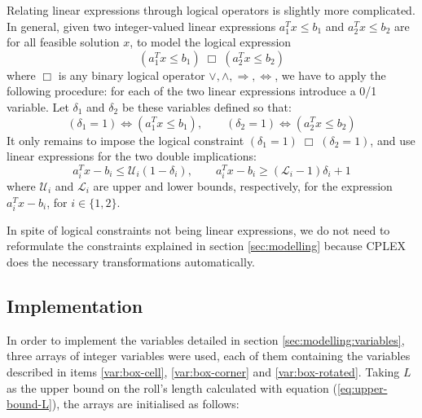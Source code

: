 Relating linear expressions through logical operators is slightly more complicated.
In general, given two integer-valued linear expressions $a_1^Tx \le b_1$ and
$a_2^Tx \le b_2$ are for all feasible solution $x$, to model the logical expression
\[
(a_1^Tx \le b_1) \;\Box\; (a_2^Tx \le b_2)
\]
where $\Box$ is any binary logical operator $\vee,\wedge,\Longrightarrow,\Longleftrightarrow$,
we have to apply the following procedure: for each of the two linear expressions introduce a 0/1
variable. Let $\delta_1$ and $\delta_2$ be these variables defined so that:
\[
(\delta_1 = 1) \Longleftrightarrow (a_1^Tx \le b_1), \qquad 
(\delta_2 = 1) \Longleftrightarrow (a_2^Tx \le b_2)
\]
It only remains to impose the logical constraint $(\delta_1 = 1) \;\Box\; (\delta_2 = 1)$,
and use linear expressions for the two double implications:
\[
a_i^Tx - b_i \le \mathcal{U}_i(1 - \delta_i), \qquad a_i^Tx - b_i \ge (\mathcal{L}_i - 1)\delta_i + 1
\]
where $\mathcal{U}_i$ and $\mathcal{L}_i$ are upper and lower bounds, respectively, for
the expression $a_i^Tx - b_i$, for $i\in\{1,2\}$.

\hfill

In spite of logical constraints not being linear expressions, we do not need to reformulate
the constraints explained in section \ref{sec:modelling} because CPLEX does the necessary
transformations automatically.

\subsection{Implementation}
\label{sec:linear-programming:implementation}

In order to implement the variables detailed in section \ref{sec:modelling:variables},
three arrays of integer variables were used, each of them containing the variables described
in items \ref{var:box-cell}, \ref{var:box-corner} and \ref{var:box-rotated}. Taking
$L$ as the upper bound on the roll's length calculated with equation (\ref{eq:upper-bound-L}),
the arrays are initialised as follows:

